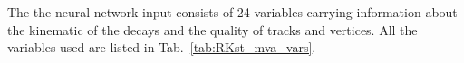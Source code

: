 The the neural network input consists of 24 variables carrying information about the kinematic of the decays
and the quality of tracks and vertices. All the variables used are listed in Tab.~\ref{tab:RKst_mva_vars}.
%
%
\begin{table}
\centering
\caption{List of variables used as inputs for the neural-network training.
}
\label{tab:RKst_mva_vars}
\end{table}
